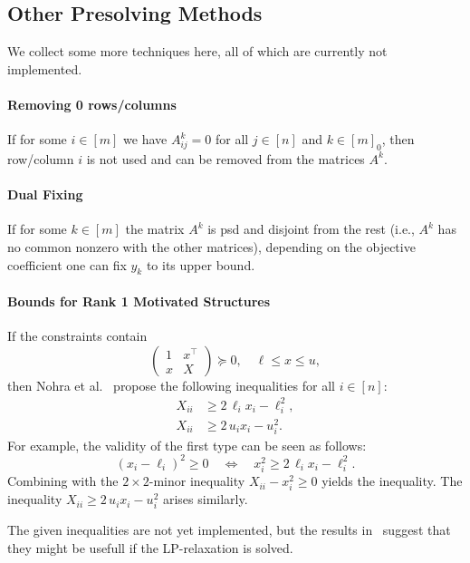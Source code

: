 \documentclass[10pt, a4paper]{article}
\newcommand{\T}{^{\top}}
\begin{document}
\subsection{Other Presolving Methods}

We collect some more techniques here, all of which are currently not implemented.

\paragraph{Removing 0 rows/columns}

If for some $i \in [m]$ we have $A_{ij}^k = 0$ for all $j \in [n]$ and
$k \in [m]_0$, then row/column $i$ is not used and can be removed from the
matrices $A^k$.

\paragraph{Dual Fixing}

If for some $k \in [m]$ the matrix $A^k$ is psd and disjoint from the rest
(i.e., $A^k$ has no common nonzero with the other matrices), depending on
the objective coefficient one can fix $y_k$ to its upper bound.

\paragraph{Bounds for Rank 1 Motivated Structures}

If the constraints contain
\[
  \begin{pmatrix}
    1 & x\T \\
    x & X
  \end{pmatrix}
  \succeq 0,
  \quad
  \ell \leq x \leq u,
\]
then Nohra et al.~\cite{NohRS20} propose the following inequalities for all
$i \in [n]$:
\begin{align*}
  X_{ii} & \geq 2\, \ell_i x_i - \ell_i^2,\\ 
  X_{ii} & \geq 2\, u_i x_i - u_i^2.
\end{align*}
For example, the validity of the first type can be seen as follows:
\[
  (x_i - \ell_i)^2 \geq 0 \quad\Leftrightarrow\quad x_i^2 \geq 2\,
  \ell_i x_i - \ell_i^2.
\]
Combining with the $2 \times 2$-minor inequality $X_{ii} - x_i^2 \geq 0$
yields the inequality. The inequality $X_{ii} \geq 2\, u_i x_i - u_i^2$
arises similarly.

The given inequalities are not yet implemented, but the results
in~\cite{NohRS20} suggest that they might be usefull if the LP-relaxation
is solved.
\end{document}
